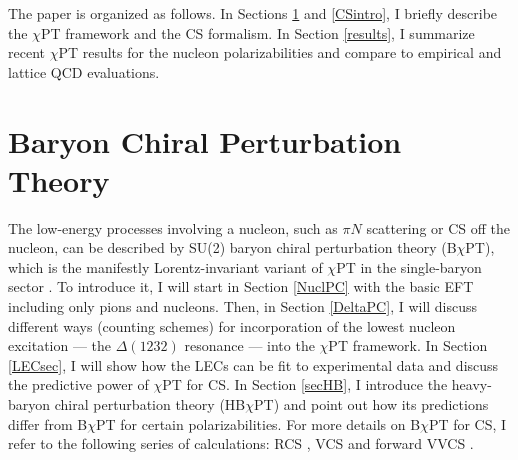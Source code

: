\documentclass[preprints,review,accept,moreauthors,pdftex]{Definitions/mdpi}
\begin{document}
The paper is organized as follows. In Sections \ref{BChPTintro} and \ref{CSintro}, I briefly describe the $\chi$PT framework and the CS formalism. In Section \ref{results}, I summarize recent $\chi$PT results for the nucleon polarizabilities and compare to empirical and lattice QCD evaluations. 



\section{Baryon Chiral Perturbation Theory} \label{BChPTintro}



The low-energy processes involving a nucleon, such as $\pi N$ scattering or CS off the nucleon, can be described by SU(2) baryon chiral perturbation theory (B$\chi$PT), which is the manifestly Lorentz-invariant variant of $\chi$PT in the single-baryon sector \cite{Gasser:1987rb,Gegelia:1999gf,Fuchs:2003qc}. To introduce it, I will start in Section \ref{NuclPC} with the basic EFT including only pions and nucleons. Then, in Section \ref{DeltaPC}, I will discuss different ways (counting schemes) for incorporation of the lowest nucleon excitation --- the $\Delta(1232)$ resonance --- into the $\chi$PT framework. In Section \ref{LECsec}, I will show how the LECs can be fit to experimental data and discuss the predictive power of $\chi$PT for CS. In Section \ref{secHB}, I introduce the heavy-baryon chiral perturbation theory (HB$\chi$PT) and point out how its predictions differ from B$\chi$PT for certain polarizabilities. For more details on B$\chi$PT for CS, I refer to the following series of calculations: RCS \cite{Lensky:2008re,Lensky:2009uv,Lensky:2015awa}, VCS \cite{Lensky:2016nui} and forward VVCS \cite{Lensky:2014dda,Alarcon:2020wjg, Alarcon:2020icz}.
\end{document}
